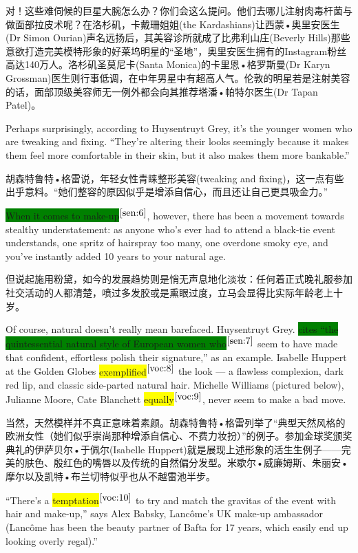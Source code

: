 \documentclass[UTF8]{ctexart}
\begin{document}
对！这些难伺候的巨星大腕怎么办？你们会这么提问。他们去哪儿注射肉毒杆菌与做面部拉皮术呢？在洛杉矶，卡戴珊姐姐(the Kardashians)让西蒙•奥里安医生(Dr Simon Ourian)声名远扬后，其美容诊所就成了比弗利山庄(Beverly Hills)那些意欲打造完美模特形象的好莱坞明星的“圣地”，奥里安医生拥有的Instagram粉丝高达140万人。洛杉矶圣莫尼卡(Santa Monica)的卡里恩•格罗斯曼(Dr Karyn Grossman)医生则行事低调，在中年男星中有超高人气。伦敦的明星若是注射美容的话，面部顶级美容师无一例外都会向其推荐塔潘•帕特尔医生(Dr Tapan Patel)。

Perhaps surprisingly, according to Huysentruyt Grey, it’s the younger women who are tweaking and fixing. “They’re altering their looks seemingly because it makes them feel more comfortable in their skin, but it also makes them more bankable.”

胡森特鲁特•格雷说，年轻女性青睐整形美容(tweaking and fixing)，这一点有些出乎意料。“她们整容的原因似乎是增添自信心，而且还让自己更具吸金力。”

\colorbox{green}{When it comes to make-up}$^{\ref{sen:6}}$, however, there has been a movement towards stealthy understatement: as anyone who’s ever had to attend a black-tie event understands, one spritz of hairspray too many, one overdone smoky eye, and you’ve instantly added 10 years to your natural age.

但说起施用粉黛，如今的发展趋势则是悄无声息地化淡妆：任何着正式晚礼服参加社交活动的人都清楚，喷过多发胶或是熏眼过度，立马会显得比实际年龄老上十岁。

Of course, natural doesn’t really mean barefaced. Huysentruyt Grey. \colorbox{green}{cites “the quintessential natural style of European women who}$^{\ref{sen:7}}$ seem to have made that confident, effortless polish their signature,” as an example. Isabelle Huppert at the Golden Globes \colorbox{yellow}{exemplified}$^{\ref{voc:8}}$ the look — a flawless complexion, dark red lip, and classic side-parted natural hair. Michelle Williams (pictured below), Julianne Moore, Cate Blanchett \colorbox{yellow}{equally}$^{\ref{voc:9}}$, never seem to make a bad move.

当然，天然模样并不真正意味着素颜。胡森特鲁特•格雷列举了“典型天然风格的欧洲女性（她们似乎崇尚那种增添自信心、不费力妆扮）”的例子。参加金球奖颁奖典礼的伊萨贝尔•于佩尔(Isabelle Huppert)就是展现上述形象的活生生例子——完美的肤色、殷红色的嘴唇以及传统的自然偏分发型。米歇尔•威廉姆斯、朱丽安•摩尔以及凯特•布兰切特似乎也从不越雷池半步。

“There’s a \colorbox{yellow}{temptation}$^{\ref{voc:10}}$ to try and match the gravitas of the event with hair and make-up,” says Alex Babsky, Lancôme’s UK make-up ambassador (Lancôme has been the beauty partner of Bafta for 17 years, which easily end up looking overly regal).”
\end{document}
